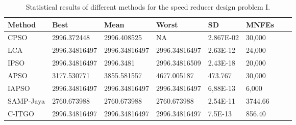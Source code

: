 
\begin{table*}[tp]
    \tiny
    \begin{center}
    
    \begin{tabular}{ P{2.0cm} P{2.0cm} P{2.0cm} P{2.0cm} P{2.0cm} P{2.0cm} P{2.0cm} P{2.0cm}  }
    \hline
    \textbf{Method} & \textbf{Best} & \textbf{Mean} & \textbf{Worst} & \textbf{SD} & \textbf{MNFEs} \\
    \hline
    
    CPSO & 2996.372448 & 2996.408525 & NA & 2.867E-02 & 30,000 \\
    LCA & 2996.34816497 & 2996.34816497 & 2996.34816497 & 2.63E-12 & 24,000 \\
    IPSO & 2996.34816497 & 2996.3481 & 2996.34816509 & 2.43E-18 & 20,000 \\
    APSO & 3177.530771 & 3855.581557 & 4677.005187 & 473.767 & 30,000 \\    
    IAPSO & 2996.34816497 & 2996.34816497 & 2996.34816497 & 6,88E-13 & 6,000 \\
    SAMP-Jaya & 2760.673988 & 2760.673988 & 2760.673988 & 2.54E-11 & 3744.66 \\    
    C-ITGO & 2996.34816497 & 2996.34816497 & 2996.34816497 & 7.5E-13 & 856.40 \\
        
    \hline
    \end{tabular}
    \end{center}
    
    \caption{ Statistical results of different methods for the speed reducer design problem I. \\[1em]}
    \label{tab:SP1}
    \end{table*}
    
    